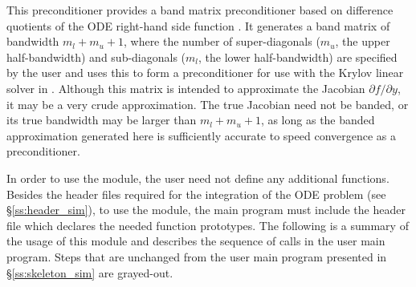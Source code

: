 This preconditioner provides a band matrix preconditioner based on
difference quotients of the ODE right-hand side function .
It generates a band matrix of bandwidth $m_l + m_u + 1$, where
the number of super-diagonals ($m_u$, the upper half-bandwidth) and
sub-diagonals ($m_l$, the lower half-bandwidth) are specified by
the user and uses this to form a preconditioner for use with the Krylov
linear solver in {\cvspgmr}.  Although this matrix is intended
to approximate the Jacobian $\partial f / \partial y$, 
it may be a very crude approximation.  The true Jacobian need not be banded,
or its true bandwidth may be larger than $m_l + m_u + 1$, as long as the
banded approximation generated here is sufficiently accurate
to speed convergence as a preconditioner. 

In order to use the {\cvbandpre} module, the user need not define any
additional functions. 
Besides the header files required for the integration of the ODE problem
(see \S\ref{ss:header_sim}),  to use the {\cvbandpre} module, the main program 
must include the header file  which declares the needed
function prototypes.
The following is a summary of the usage of this module and describes the sequence
of calls in the user main program. Steps that are unchanged from the user main
program presented in \S\ref{ss:skeleton_sim} are grayed-out.
